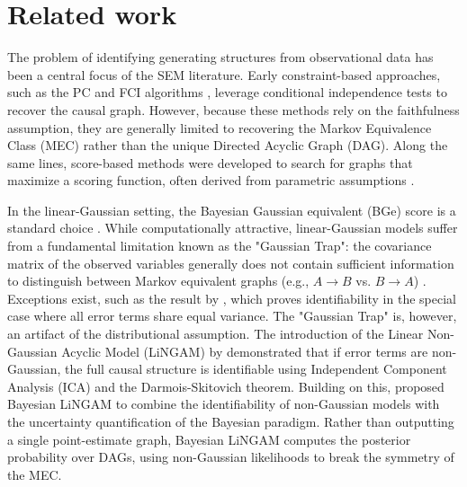 \documentclass[accepted]{uai2026} %
\theoremstyle{boldremark}
\begin{document}

\section{Related work}\label{sec:related_work}
The problem of identifying generating structures from observational data has been a central focus of the SEM literature. Early constraint-based approaches, such as the PC and FCI algorithms \citet{spirtes:00}, leverage conditional independence tests to recover the causal graph. However, because these methods rely on the faithfulness assumption, they are generally limited to recovering the Markov Equivalence Class (MEC) rather than the unique Directed Acyclic Graph (DAG). Along the same lines, score-based methods were developed to search for graphs that maximize a scoring function, often derived from parametric assumptions \citet{Chickering02a, heckerman2006a}. 

In the linear-Gaussian setting, the Bayesian Gaussian equivalent (BGe) score is a standard choice \citet{geiger2021learninggaussiannetworks}. While computationally attractive, linear-Gaussian models suffer from a fundamental limitation known as the "Gaussian Trap": the covariance matrix of the observed variables generally does not contain sufficient information to distinguish between Markov equivalent graphs (e.g., $A \rightarrow B$ vs. $B \rightarrow A$) \citet{shimizu06a}. Exceptions exist, such as the result by \citet{peters2014identifiability}, which proves identifiability in the special case where all error terms share equal variance. The "Gaussian Trap" is, however, an artifact of the distributional assumption. The introduction of the Linear Non-Gaussian Acyclic Model (LiNGAM) by \citet{shimizu06a} demonstrated that if error terms are non-Gaussian, the full causal structure is identifiable using Independent Component Analysis (ICA) and the Darmois-Skitovich theorem. Building on this, \citet{hoyer2012bayesiandiscoverylinearacyclic} proposed Bayesian LiNGAM to combine the identifiability of non-Gaussian models with the uncertainty quantification of the Bayesian paradigm. Rather than outputting a single point-estimate graph, Bayesian LiNGAM computes the posterior probability over DAGs, using non-Gaussian likelihoods to break the symmetry of the MEC.
\end{document}
